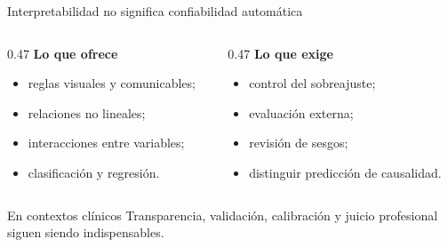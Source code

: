 \documentclass[aspectratio=169,11pt]{beamer}
\newcommand{\framesource}{}
\newcommand{\source}[1]{%
  \gdef\framesource{Fuente: #1}%
}
\begin{document}
\begin{frame}{Interpretabilidad no significa confiabilidad automática}
  \begin{columns}[T,onlytextwidth]
    \begin{column}{0.47\textwidth}
      {\color{Petroleo}\Large\bfseries Lo que ofrece}\par
      \vspace{0.25cm}
      \begin{itemize}
        \item reglas visuales y comunicables;
        \item relaciones no lineales;
        \item interacciones entre variables;
        \item clasificación y regresión.
      \end{itemize}
    \end{column}
    \begin{column}{0.47\textwidth}
      {\color{Coral!90!black}\Large\bfseries Lo que exige}\par
      \vspace{0.25cm}
      \begin{itemize}
        \item control del sobreajuste;
        \item evaluación externa;
        \item revisión de sesgos;
        \item distinguir predicción de causalidad.
      \end{itemize}
    \end{column}
  \end{columns}
  \vspace{0.30cm}
  \begin{block}{En contextos clínicos}
    Transparencia, validación, calibración y juicio profesional siguen siendo indispensables.
  \end{block}
  \source{Ma (2018); Breiman et al. (1984).}
\end{frame}
\end{document}
